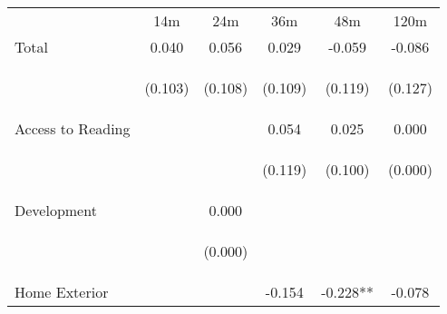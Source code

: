 \begin{tabular}{lccccc}
\hline \noalign{\smallskip} & 14m & 24m & 36m & 48m & 120m\\
\noalign{\smallskip}\hline \noalign{\smallskip}Total & 0.040 & 0.056 & 0.029 & -0.059 & -0.086\\
 & \begin{footnotesize}(0.103)\end{footnotesize} & \begin{footnotesize}(0.108)\end{footnotesize} & \begin{footnotesize}(0.109)\end{footnotesize} & \begin{footnotesize}(0.119)\end{footnotesize} & \begin{footnotesize}(0.127)\end{footnotesize}\\
\noalign{\smallskip}Access to Reading &  &  & 0.054 & 0.025 & 0.000\\
 & \begin{footnotesize}\end{footnotesize} & \begin{footnotesize}\end{footnotesize} & \begin{footnotesize}(0.119)\end{footnotesize} & \begin{footnotesize}(0.100)\end{footnotesize} & \begin{footnotesize}(0.000)\end{footnotesize}\\
\noalign{\smallskip}Development &  & 0.000 &  &  & \\
 & \begin{footnotesize}\end{footnotesize} & \begin{footnotesize}(0.000)\end{footnotesize} & \begin{footnotesize}\end{footnotesize} & \begin{footnotesize}\end{footnotesize} & \begin{footnotesize}\end{footnotesize}\\
\noalign{\smallskip}Home Exterior &  &  & -0.154 & -0.228** & -0.078\\

\end{tabular}
